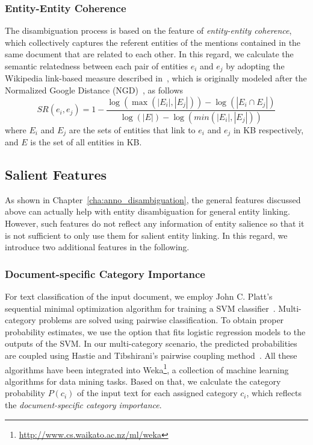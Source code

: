 \subsubsection{Entity-Entity Coherence}
The disambiguation process is based on the feature of \emph{entity-entity coherence}, which collectively captures the referent entities of the mentions contained in the same document that are related to each other. In this regard, we calculate the semantic relatedness between each pair of entities $e_i$ and $e_j$ by adopting the Wikipedia link-based measure described in~\cite{witten2008effective,DBLP:conf/cikm/MilneW08}, which is originally modeled after the Normalized Google Distance (NGD)~\cite{DBLP:journals/tkde/CilibrasiV07},  as follows 
\begin{equation}\label{anno_salient:NGD}
SR(e_i,e_j)=1-\frac{\log(\max(|E_i|,|E_j|))-\log(|E_i\cap E_j|)}{\log(|E|)-\log(min(|E_i|,|E_j|))}
\end{equation}
where $E_i$ and $E_j$ are the sets of entities that link to $e_i$ and $e_j$ in KB respectively, and $E$ is the set of all entities in KB.  

\subsection{Salient Features}

As shown in Chapter~\ref{cha:anno_disambiguation}, the general features discussed above can actually help with entity disambiguation for general entity linking. However, such features do not reflect any information of entity salience so that it is not sufficient to only use them for salient entity linking. In this regard, we introduce two additional features in the following. 

\subsubsection{Document-specific Category Importance}
For text classification of the input document, we employ John C. Platt's sequential minimal optimization algorithm for training a SVM classifier~\cite{Platt:1999:FTS:299094.299105,Keerthi:2001:IPS:1120489.1120499}. 
Multi-category problems are solved using pairwise classification. To obtain proper probability estimates, we use the option that fits logistic regression models to the outputs of the SVM. In our multi-category scenario, the predicted probabilities are coupled using Hastie and Tibshirani's pairwise coupling method~\cite{Hastie:1998:CPC:302528.302744}. 
All these algorithms have been integrated into Weka\footnote{\url{http://www.cs.waikato.ac.nz/ml/weka}}, a collection of machine learning algorithms for data mining tasks. Based on that, we calculate the category probability $P(c_i)$ of the input text for each assigned category $c_i$, which reflects the \emph{document-specific category importance}.


